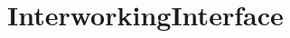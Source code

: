 \href{https://api.travis-ci.org/symbiote-h2020/InterworkingInterface}{\tt } \href{https://codecov.io/github/symbiote-h2020/InterworkingInterface}{\tt }

\section*{Interworking\+Interface}